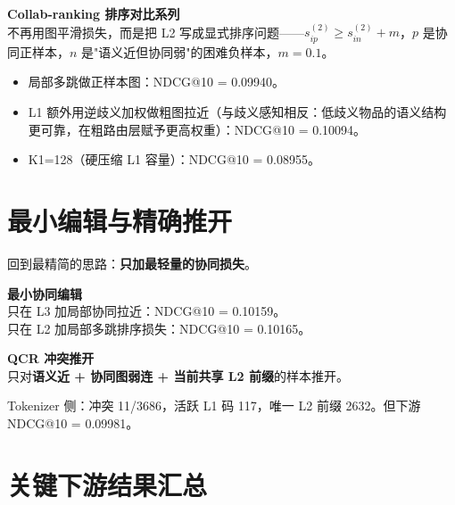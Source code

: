 \documentclass[11pt]{article}
\begin{document}
\medskip
\textbf{Collab-ranking 排序对比系列}\\
不再用图平滑损失，而是把 L2 写成显式排序问题——$s_{ip}^{(2)} \ge s_{in}^{(2)} + m$，$p$ 是协同正样本，$n$ 是"语义近但协同弱"的困难负样本，$m=0.1$。

\begin{itemize}
  \item 局部多跳做正样本图：NDCG@10 = 0.09940。
  \item L1 额外用逆歧义加权做粗图拉近（与歧义感知相反：低歧义物品的语义结构更可靠，在粗路由层赋予更高权重）：NDCG@10 = 0.10094。
  \item K1=128（硬压缩 L1 容量）：NDCG@10 = 0.08955。
\end{itemize}

\section{最小编辑与精确推开}

回到最精简的思路：\textbf{只加最轻量的协同损失}。

\medskip
\textbf{最小协同编辑}\\
只在 L3 加局部协同拉近：NDCG@10 = 0.10159。\\
只在 L2 加局部多跳排序损失：NDCG@10 = 0.10165。

\medskip
\textbf{QCR 冲突推开}\\
只对\textbf{语义近 + 协同图弱连 + 当前共享 L2 前缀}的样本推开。

Tokenizer 侧：冲突 11/3686，活跃 L1 码 117，唯一 L2 前缀 2632。但下游 NDCG@10 = 0.09981。

\section{关键下游结果汇总}
\end{document}

